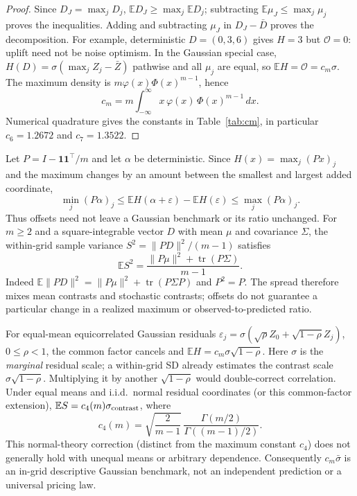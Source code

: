 \begin{proof}
Since $D_J=\max_jD_j$, $\mathbb ED_J\ge\max_j\mathbb ED_j$;
subtracting $\mathbb E\mu_J\le\max_j\mu_j$ proves the inequalities.
Adding and subtracting $\mu_J$ in $D_J-\bar D$ proves the decomposition.
For example, deterministic $D=(0,3,6)$ gives $H=3$ but $\mathcal O=0$:
uplift need not be noise optimism. In the Gaussian special case,
$H(D)=\sigma(\max_j Z_j-\bar Z)$ pathwise and all $\mu_j$ are equal, so
$\mathbb EH=\mathcal O=c_m\sigma$. The maximum density is
$m\varphi(x)\Phi(x)^{m-1}$, hence
\[
c_m=m\int_{-\infty}^{\infty}x\,\varphi(x)\,\Phi(x)^{m-1}\,dx.
\]
Numerical quadrature gives the constants in Table~\ref{tab:cm}, in
particular $c_6=1.2672$ and $c_7=1.3522$.
\end{proof}

\begin{remarkx}
Let $P=I-\mathbf1\mathbf1^\top/m$ and let $\alpha$ be deterministic. Since
$H(x)=\max_j(Px)_j$ and the maximum changes by an amount between the
smallest and largest added coordinate,
\[
\min_j(P\alpha)_j\le
\mathbb EH(\alpha+\varepsilon)-\mathbb EH(\varepsilon)
\le\max_j(P\alpha)_j.
\]
Thus offsets need not leave a Gaussian benchmark or its ratio unchanged.
For $m\ge2$ and a square-integrable vector $D$ with mean $\mu$ and covariance
$\Sigma$, the within-grid sample variance $S^2=\|PD\|^2/(m-1)$ satisfies
\[
\mathbb ES^2=
\frac{\|P\mu\|^2+\operatorname{tr}(P\Sigma)}{m-1}.
\]
Indeed $\mathbb E\|PD\|^2=\|P\mu\|^2+
\operatorname{tr}(P\Sigma P)$ and $P^2=P$. The spread therefore mixes
mean contrasts and stochastic contrasts; offsets do not guarantee a
particular change in a realized maximum or observed-to-predicted ratio.

For equal-mean equicorrelated Gaussian residuals
$\varepsilon_j=\sigma(\sqrt\rho Z_0+\sqrt{1-\rho}Z_j)$,
$0\le\rho<1$, the common factor cancels and
$\mathbb EH=c_m\sigma\sqrt{1-\rho}$. Here $\sigma$ is the \emph{marginal}
residual scale; a within-grid SD already estimates the contrast scale
$\sigma\sqrt{1-\rho}$. Multiplying it by another $\sqrt{1-\rho}$ would
double-correct correlation. Under equal means and i.i.d.\ normal residual
coordinates (or this common-factor extension),
$\mathbb ES=c_4(m)\sigma_{\rm contrast}$, where
\[
c_4(m)=\sqrt{\frac{2}{m-1}}\,
\frac{\Gamma(m/2)}{\Gamma((m-1)/2)}.
\]
This normal-theory correction (distinct from the maximum constant $c_4$)
does not generally hold with unequal means or arbitrary dependence.
Consequently $c_m\bar\sigma$ is an in-grid descriptive Gaussian benchmark,
not an independent prediction or a universal pricing law.
\end{remarkx}

